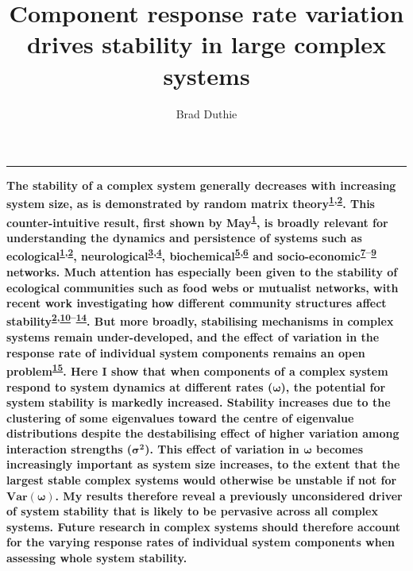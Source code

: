 \documentclass[]{article}
\title{Component response rate variation drives stability in large complex
systems}
\author{Brad Duthie}
\date{}
\begin{document}
\maketitle

\begin{center}\rule{0.5\linewidth}{\linethickness}\end{center}

\textbf{The stability of a complex system generally decreases with
increasing system size, as is demonstrated by random matrix
theory\textsuperscript{\protect\hyperlink{ref-May1972}{1},\protect\hyperlink{ref-Allesina2012}{2}}.
This counter-intuitive result, first shown by
May\textsuperscript{\protect\hyperlink{ref-May1972}{1}}, is broadly
relevant for understanding the dynamics and persistence of systems such
as
ecological\textsuperscript{\protect\hyperlink{ref-May1972}{1},\protect\hyperlink{ref-Allesina2012}{2}},
neurological\textsuperscript{\protect\hyperlink{ref-Gray2008}{3},\protect\hyperlink{ref-Gray2009}{4}},
biochemical\textsuperscript{\protect\hyperlink{ref-Rosenfeld2009}{5},\protect\hyperlink{ref-MacArthur2010}{6}}
and
socio-economic\textsuperscript{\protect\hyperlink{ref-Haldane2011}{7}--\protect\hyperlink{ref-Bardoscia2017}{9}}
networks. Much attention has especially been given to the stability of
ecological communities such as food webs or mutualist networks, with
recent work investigating how different community structures affect
stability\textsuperscript{\protect\hyperlink{ref-Allesina2012}{2},\protect\hyperlink{ref-Mougi2012}{10}--\protect\hyperlink{ref-Patel2018}{14}}.
But more broadly, stabilising mechanisms in complex systems remain
under-developed, and the effect of variation in the response rate of
individual system components remains an open
problem\textsuperscript{\protect\hyperlink{ref-Allesina2015}{15}}. Here
I show that when components of a complex system respond to system
dynamics at different rates (\(\boldsymbol{\omega}\)), the potential for
system stability is markedly increased. Stability increases due to the
clustering of some eigenvalues toward the centre of eigenvalue
distributions despite the destabilising effect of higher variation among
interaction strengths (\(\boldsymbol{\sigma^{2}}\)). This effect of
variation in \(\boldsymbol{\omega}\) becomes increasingly important as
system size increases, to the extent that the largest stable complex
systems would otherwise be unstable if not for
\(\boldsymbol{Var(\omega)}\). My results therefore reveal a previously
unconsidered driver of system stability that is likely to be pervasive
across all complex systems. Future research in complex systems should
therefore account for the varying response rates of individual system
components when assessing whole system stability.}
\end{document}
